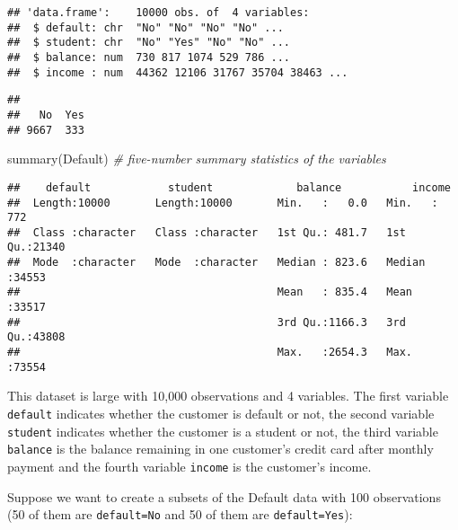 \documentclass[
]{article}
\newenvironment{Shaded}{\begin{snugshade}}{\end{snugshade}}
\newcommand{\CommentTok}[1]{\textcolor[rgb]{0.56,0.35,0.01}{\textit{#1}}}
\newcommand{\FunctionTok}[1]{\textcolor[rgb]{0.00,0.00,0.00}{#1}}
\newcommand{\NormalTok}[1]{#1}
\newcommand{\SpecialCharTok}[1]{\textcolor[rgb]{0.00,0.00,0.00}{#1}}
\begin{document}
\begin{verbatim}
## 'data.frame':    10000 obs. of  4 variables:
##  $ default: chr  "No" "No" "No" "No" ...
##  $ student: chr  "No" "Yes" "No" "No" ...
##  $ balance: num  730 817 1074 529 786 ...
##  $ income : num  44362 12106 31767 35704 38463 ...
\end{verbatim}

\begin{Shaded}
\end{Shaded}

\begin{verbatim}
## 
##   No  Yes 
## 9667  333
\end{verbatim}

\begin{Shaded}
\begin{Highlighting}[]
\FunctionTok{summary}\NormalTok{(Default) }\CommentTok{\# five{-}number summary statistics of the variables}
\end{Highlighting}
\end{Shaded}

\begin{verbatim}
##    default            student             balance           income     
##  Length:10000       Length:10000       Min.   :   0.0   Min.   :  772  
##  Class :character   Class :character   1st Qu.: 481.7   1st Qu.:21340  
##  Mode  :character   Mode  :character   Median : 823.6   Median :34553  
##                                        Mean   : 835.4   Mean   :33517  
##                                        3rd Qu.:1166.3   3rd Qu.:43808  
##                                        Max.   :2654.3   Max.   :73554
\end{verbatim}

This dataset is large with 10,000 observations and 4 variables. The
first variable \texttt{default} indicates whether the customer is
default or not, the second variable \texttt{student} indicates whether
the customer is a student or not, the third variable \texttt{balance} is
the balance remaining in one customer's credit card after monthly
payment and the fourth variable \texttt{income} is the customer's
income.

Suppose we want to create a subsets of the Default data with 100
observations (50 of them are \texttt{default=No} and 50 of them are
\texttt{default=Yes}):
\end{document}
